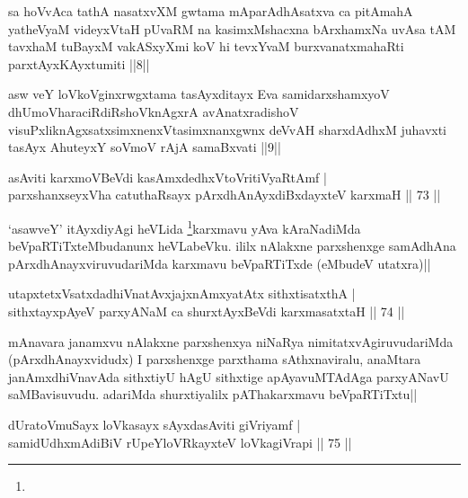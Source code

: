 \begin{shl}
sa hoVvAca tathA nasatxvXM gwtama mAparAdhAsatxva ca pitAmahA yatheVyaM videyxVtaH pUvaRM na kasimxMshacxna bArxhamxNa uvAsa tAM tavxhaM tuBayxM vakASxyXmi koV hi tevxYvaM burxvanatxmahaRti parxtAyxKAyxtumiti ||8||
\end{shl}

\begin{shl}
asw veY loVkoV\s ginxrwgxtama tasAyxditayx Eva samidarxshamxyoV dhUmoV\s haraciRdiRshoV\s knAgxrA avAnatxradishoV visuPxliknAgxsatxsimxnenxVtasimxnanxgwnx deVvAH sharxdAdhxM juhavxti tasAyx AhuteyxY soVmoV rAjA samaBxvati ||9||
\end{shl}


\begin{shl}
asAviti karxmoV\s BeVdi kasAmxdedhxVtoVritiVyaRtAmf | \\
parxshanxseyxVha catuthaRsayx pArxdhAnAyxdiBxdayxteV karxmaH \hfill|| 73 || 
\end{shl}

\begin{artha}
`asawveY' itAyxdiyAgi heVLida \footnote[1]{}karxmavu yAva kAraNadiMda 
beVpaRTiTxteMbudanunx heVLabeVku. ililx nAlakxne parxshenxge samAdhAna 
pArxdhAnayxviruvudariMda karxmavu beVpaRTiTxde (eMbudeV utatxra)||
\end{artha}


\begin{shl}
utapxtetxVsatxdadhiVnatAvxjajxnAmxyatAtx sithxtisatxthA | \\
sithxtayxpAyeV parxyANaM ca shurxtAyx\s BeVdi karxmasatxtaH \hfill|| 74 || 
\end{shl}

\begin{artha}
mAnavara janamxvu nAlakxne parxshenxya niNaRya nimitatxvAgiruvudariMda 
(pArxdhAnayxvidudx) I parxshenxge parxthama sAthxnaviralu, anaMtara 
janAmxdhiVnavAda sithxtiyU hAgU sithxtige apAyavuMTAdAga parxyANavU 
saMBavisuvudu. adariMda shurxtiyalilx pAThakarxmavu beVpaRTiTxtu||
\end{artha}


\begin{shl}
dUratoV\s muSayx loVkasayx sAyxdasAviti giVriyamf | \\
samidUdhxmAdiBiV rUpeYloVRkayxteV loVkagiVrapi \hfill|| 75 || 
\end{shl}

